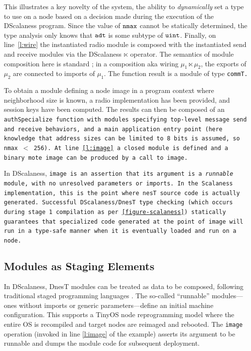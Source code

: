 This illustrates a key novelty of the system, the ability to \emph{dynamically} set a type to
use on a node based on a decision made during the execution of the DScalaness program. Since the
value of $\tt{nmax}$ cannot be statically determined, the type analysis only knows that
$\tt{adt}$ is some subtype of $\tt{uint}$. Finally, on line~\ref{l:wire} the instantiated radio
module is composed with the instantiated send and receive modules via the DScalaness $\ltimes$
operator. The semantics of module composition here is standard \cite{Cardelli-1997}; in a
composition aka wiring $\mu_1 \ltimes \mu_2$, the exports of $\mu_2$ are connected to imports of
$\mu_1$. The function result is a module of type \tt{commT}.

To obtain a module defining a node image in a program context where neighborhood size is known,
a radio implementation has been provided, and session keys have been computed. The results can
then be composed of an \tt{authSpecialize} function with modules specifying top-level message
send and receive behaviors, and a \texttt{main} application entry point (here knowledge that
address sizes can be limited to 8 bits is assumed, so \tt{nmax} $<$ 256). At line \ref{l:image}
a closed module is defined and a binary mote image can be produced by a call to \tt{image}.

In DScalaness, \tt{image} is an assertion that its argument is a \emph{runnable} module, with no
unresolved parameters or imports. In the Scalaness implementation, this is the point where nesT
source code is actually generated. Successful DScalaness/DnesT type checking (which occurs
during stage 1 compilation as per \autoref{figure-scalaness}) statically guarantees that
specialized code generated at the point of \tt{image} will run in a type-safe manner when it is
eventually loaded and run on a node.

\subsection{Modules as Staging Elements}

In DScalaness, DnesT modules can be treated as data to be composed, following traditional staged
programming languages \cite{Taha-MetaML}. The so-called ``runnable'' modules---ones without
imports or generic parameters---define an initial machine configuration. This supports a TinyOS
node reprogramming model where the entire OS is recompiled and target nodes are reimaged and
rebooted. The \texttt{image} operation (invoked in line \ref{l:image} of the example) asserts
its argument to be runnable and dumps the module code for subsequent deployment.

